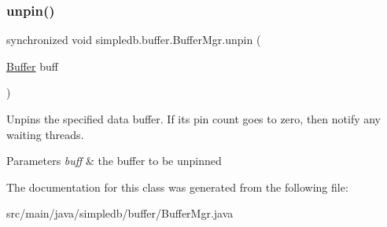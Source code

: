 \subsubsection{\texorpdfstring{unpin()}{unpin()}}
{\footnotesize\ttfamily synchronized void simpledb.\+buffer.\+Buffer\+Mgr.\+unpin (\begin{DoxyParamCaption}\item[{\hyperlink{classsimpledb_1_1buffer_1_1Buffer}{Buffer}}]{buff }\end{DoxyParamCaption})\hspace{0.3cm}{\ttfamily [inline]}}

Unpins the specified data buffer. If its pin count goes to zero, then notify any waiting threads. 
\begin{DoxyParams}{Parameters}
{\em buff} & the buffer to be unpinned \\
\hline
\end{DoxyParams}


The documentation for this class was generated from the following file\+:\begin{DoxyCompactItemize}
\item 
src/main/java/simpledb/buffer/Buffer\+Mgr.\+java\end{DoxyCompactItemize}
